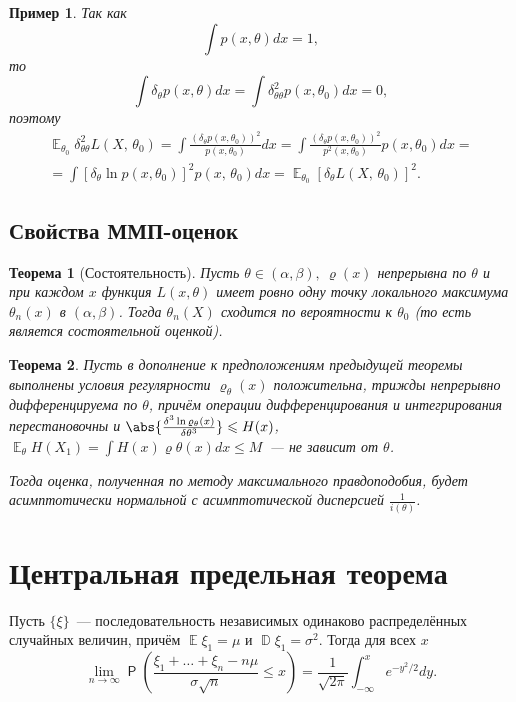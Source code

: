 \documentclass[12pt]{article}
\DeclareMathOperator{\mexp}{\mathbb{E}}
\DeclareMathOperator{\var}{\mathbb{D}}
\DeclareMathOperator{\prob}{\mathsf{P}}
\renewcommand{\leq}{\leqslant}
\newtheorem*{example*}{Пример}
\newtheorem*{theorem*}{Теорема}
\begin{document}
\begin{example*}
        Так как
        \begin{equation*}
            \int p(x, \theta) dx = 1,
        \end{equation*}
        то
        \begin{equation*}
            \int \delta_\theta p(x, \theta) dx = \int \delta_{\theta \theta}^2 p(x, \theta_0) dx = 0,
        \end{equation*}
        поэтому
        \begin{multline*}
            \mexp_{\theta_0} \delta_{\theta \theta}^2 L(X,\, \theta_0) = \int \frac{(\delta_\theta p(x, \theta_0))^2}{p(x, \theta_0)} dx = \int \frac{(\delta_\theta p(x, \theta_0))^2}{p^2(x, \theta_0)} p(x, \theta_0) dx =\\ = \int \left[\delta_\theta \ln p(x, \theta_0)\right]^2 p(x,\, \theta_0) dx = \mexp_{\theta_0}\left[\delta_\theta L(X,\, \theta_0)\right]^2.
        \end{multline*}
    \end{example*}

    \subsection{Свойства ММП-оценок}
    \begin{theorem*}[Состоятельность]
        Пусть $\theta \in (\alpha, \beta),\ \varrho(x)$ непрерывна по $\theta$ и при каждом $x$ функция $L(x, \theta)$ имеет ровно одну точку локального максимума $\theta_n(x)$ в $(\alpha, \beta)$. Тогда $\theta_n(X)$ сходится по вероятности к $\theta_0$ (то есть является состоятельной оценкой).
    \end{theorem*}
    \begin{theorem*}
        Пусть в дополнение к предположениям предыдущей теоремы выполнены условия регулярности $\varrho_\theta(x)$ положительна, трижды непрерывно дифференцируема по $\theta$, причём операции дифференцирования и интегрирования перестановочны и $\abs{\frac{\delta^3 \ln \varrho_\theta(x)}{\delta \theta^3}} \leq H(x)$, $ \mexp_\theta H(X_1) = \int H(x) \varrho \theta(x) dx \leq M$~--- не зависит от $\theta$.

        Тогда оценка, полученная по методу максимального правдоподобия, будет асимптотически нормальной с асимптотической дисперсией $\frac{1}{i(\theta)}$.
    \end{theorem*}

    \section{Центральная предельная теорема}
    Пусть $\{\xi\}$~--- последовательность независимых одинаково распределённых случайных величин, причём $\mexp \xi_1 = \mu$ и $\var\xi_1 = \sigma^2$. Тогда для всех $x$
    \begin{equation*}
        \lim_{n \to \infty} \prob\left(\frac{\xi_1 + \ldots + \xi_n - n\mu}{\sigma \sqrt{n}} \leq x\right) = \frac{1}{\sqrt{2\pi}} \int_{-\infty}^x e^{-y^2/2} dy.
    \end{equation*}
\end{document}
